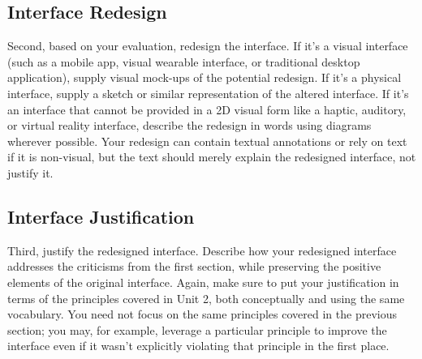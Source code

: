 \documentclass[12pt,letterpaper]{article}
\begin{document}
\subsection*{Interface Redesign}
Second, based on your evaluation, redesign the interface. If it’s a visual interface (such as a mobile app, visual wearable interface, or traditional desktop application), supply visual mock-ups of the potential redesign. If it’s a physical interface, supply a sketch or similar representation of the altered interface. If it’s an interface that cannot be provided in a 2D visual form like a haptic, auditory, or virtual reality interface, describe the redesign in words using diagrams wherever possible. Your redesign can contain textual annotations or rely on text if it is non-visual, but the text should merely explain the redesigned interface, not justify it.

\subsection*{Interface Justification}
Third, justify the redesigned interface. Describe how your redesigned interface addresses the criticisms from the first section, while preserving the positive elements of the original interface. Again, make sure to put your justification in terms of the principles covered in Unit 2, both conceptually and using the same vocabulary. You need not focus on the same principles covered in the previous section; you may, for example, leverage a particular principle to improve the interface even if it wasn’t explicitly violating that principle in the first place.

 

\end{document}
